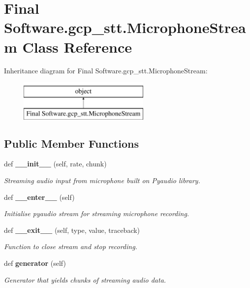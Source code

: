 \section{Final Software.\+gcp\+\_\+stt.\+Microphone\+Stream Class Reference}
\label{class_final_01_software_1_1gcp__stt_1_1_microphone_stream}
Inheritance diagram for Final Software.\+gcp\+\_\+stt.\+Microphone\+Stream\+:\begin{figure}[H]
\begin{center}
\leavevmode
\includegraphics[height=2.000000cm]{class_final_01_software_1_1gcp__stt_1_1_microphone_stream}
\end{center}
\end{figure}
\subsection*{Public Member Functions}
\begin{DoxyCompactItemize}
\item 
def \textbf{ \+\_\+\+\_\+init\+\_\+\+\_\+} (self, rate, chunk)
\begin{DoxyCompactList}\small\item\em Streaming audio input from microphone built on Pyaudio library. \end{DoxyCompactList}\item 
def \textbf{ \+\_\+\+\_\+enter\+\_\+\+\_\+} (self)
\begin{DoxyCompactList}\small\item\em Initialise pyaudio stream for streaming microphone recording. \end{DoxyCompactList}\item 
def \textbf{ \+\_\+\+\_\+exit\+\_\+\+\_\+} (self, type, value, traceback)
\begin{DoxyCompactList}\small\item\em Function to close stream and stop recording. \end{DoxyCompactList}\item 
def \textbf{ generator} (self)
\begin{DoxyCompactList}\small\item\em Generator that yields chunks of streaming audio data. \end{DoxyCompactList}\end{DoxyCompactItemize}
